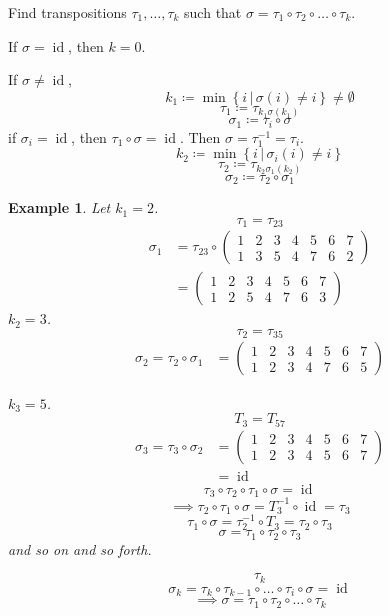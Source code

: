 \documentclass{article}
\newtheorem{example}{Example}  \numberwithin{example}{section}
\newcommand{\setdef}[2]{\left\{\left.#1\,\right|\,#2\right\}}
\begin{document}
Find transpositions $\tau_1, \dots, \tau_k$ such that $\sigma = \tau_1 \circ \tau_2 \circ \dots \circ \tau_k$.

If $\sigma = \operatorname{id}$, then $k=0$.

If $\sigma \neq \operatorname{id}$,
\[ k_1 \coloneqq \min\setdef{i}{\sigma(i) \neq i} \neq \emptyset \]
\[ \tau_1 \coloneqq \tau_{k_1 \sigma(k_1)} \]
\[ \sigma_1 \coloneqq \tau_i \circ \sigma \]
if $\sigma_i = \operatorname{id}$, then $\tau_1 \circ \sigma = \operatorname{id}$. Then $\sigma = \tau_1^{-1} = \tau_i$.
\[ k_2 \coloneqq \min\setdef{i}{\sigma_i(i) \neq i} \]
\[ \tau_2 \coloneqq \tau_{k_2 \sigma_1(k_2)} \]
\[ \sigma_2 \coloneqq \tau_2 \circ \sigma_1 \]


\begin{example}
  Let $k_1 = 2$.
  \[ \tau_1 = \tau_{23} \]
  \begin{align*}
    \sigma_1 &= \tau_{23} \circ \begin{pmatrix} 1 & 2 & 3 & 4 & 5 & 6 & 7 \\ 1 & 3 & 5 & 4 & 7 & 6 & 2 \end{pmatrix} \\
      &= \begin{pmatrix} 1 & 2 & 3 & 4 & 5 & 6 & 7 \\ 1 & 2 & 5 & 4 & 7 & 6 & 3 \end{pmatrix}
  \end{align*}
  $k_2 = 3$.
  \[ \tau_2 = \tau_{35} \]
  \begin{align*}
    \sigma_2 = \tau_2 \circ \sigma_1 &= \begin{pmatrix} 1 & 2 & 3 & 4 & 5 & 6 & 7 \\ 1 & 2 & 3 & 4 & 7 & 6 & 5 \end{pmatrix}
  \end{align*}

  $k_3 = 5$.
  \[ T_3 = T_{57} \]
  \begin{align*}
    \sigma_3 = \tau_3 \circ \sigma_2 &= \begin{pmatrix} 1 & 2 & 3 & 4 & 5 & 6 & 7 \\ 1 & 2 & 3 & 4 & 5 & 6 & 7 \end{pmatrix} \\
      &= \operatorname{id}
  \end{align*}
  \[ \tau_3 \circ \tau_2 \circ \tau_1 \circ \sigma = \operatorname{id} \]
  \[ \implies \tau_2 \circ \tau_1 \circ \sigma = T_3^{-1} \circ \operatorname{id} = \tau_3 \]
  \[ \tau_1 \circ \sigma = \tau_2^{-1} \circ T_3 = \tau_2 \circ \tau_3 \]
  \[ \sigma = \tau_1 \circ \tau_2 \circ \tau_3 \]
  and so on and so forth.

  \[ \tau_k \]
  \[ \sigma_k = \tau_k \circ \tau_{k-1} \circ \dots \circ \tau_{i} \circ \sigma = \operatorname{id} \]
  \[ \implies \sigma = \tau_1 \circ \tau_2 \circ \dots \circ \tau_k \]
\end{example}
\end{document}
